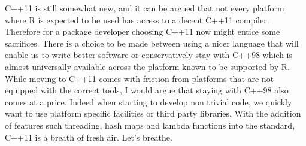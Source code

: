 C++11 is still somewhat new, and it can be argued that not every platform
where R is expected to be used has access to a decent C++11 compiler. Therefore
for a package developer choosing C++11 now might entice some sacrifices. There is a
choice to be made between using a nicer language that will enable us to write
better software or conservatively stay with C++98 which is
almost universally available across the platform known to be supported by R.
While moving to C++11 comes with friction from platforms that are not equipped
with the correct tools, I would argue that staying
with C++98 also comes at a price. Indeed when starting to develop non trivial
code, we quickly want to use platform specific facilities or
third party libraries. With the addition of features such threading, hash maps and lambda
functions into the standard, C++11 is a breath of fresh air. Let's breathe.



\address{Romain François\\
    R Enthusiasts\\
    1 place de l'égalité. 42400 Saint Chamond\\
    FRANCE }

\address{Kevin Ushey\\
  Statistical Programmer\\
  Fred Hutchinson Cancer Research Center\\
  Seattle, WA, USA}
